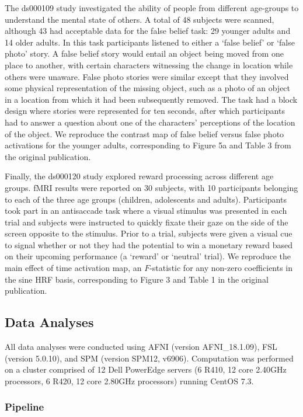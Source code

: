 The ds000109 study investigated the ability of people from different age-groups to understand the mental state of others. A total of 48 subjects were scanned, although 43 had acceptable data for the false belief task: 29 younger adults and 14 older adults. In this task participants listened to either a `false belief' or `false photo' story. A false belief story would entail an object being moved from one place to another, with certain characters witnessing the change in location while others were unaware. False photo stories were similar except that they involved some physical representation of the missing object, such as a photo of an object in a location from which it had been subsequently removed. The task had a block design where stories were represented for ten seconds, after which participants had to answer a question about one of the characters' perceptions of the location of the object. We reproduce the contrast map of false belief versus false photo activations for the younger adults, corresponding to Figure 5a and Table 3 from the original publication.

Finally, the ds000120 study explored reward processing across different age groups. fMRI results were reported on 30 subjects, with 10 participants belonging to each of the three age groups (children, adolescents and adults). Participants took part in an antisaccade task where a visual stimulus was presented in each trial and subjects were instructed to quickly fixate their gaze on the side of the screen opposite to the stimulus. Prior to a trial, subjects were given a visual cue to signal whether or not they had the potential to win a monetary reward based on their upcoming performance (a `reward' or `neutral' trial). We reproduce the main effect of time activation map, an $F$-statistic for any non-zero coefficients in the sine HRF basis, corresponding to Figure 3 and Table 1 in the original publication.  

\subsection{Data Analyses}

All data analyses were conducted using AFNI (version AFNI\_18.1.09), FSL (version 5.0.10), and SPM (version SPM12, v6906). Computation was performed on a cluster comprised of 12 Dell PowerEdge servers (6 R410, 12 core 2.40GHz processors, 6 R420, 12 core 2.80GHz processors) running CentOS 7.3.

\subsubsection{Pipeline}

